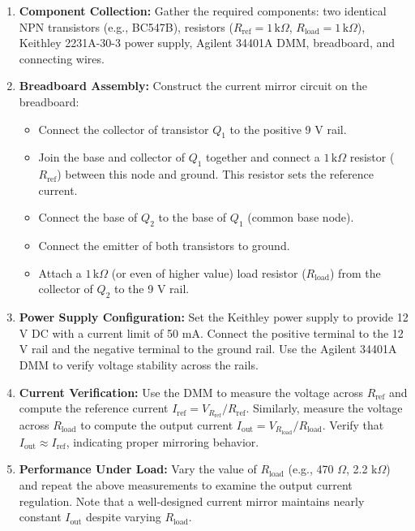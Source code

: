 \documentclass[conference]{IEEEtran}
\begin{document}
\begin{enumerate}
    \item \textbf{Component Collection:} Gather the required components: two identical NPN transistors (e.g., BC547B), resistors ($R_{\text{ref}} = 1 \, \text{k}\Omega$, $R_{\text{load}} = 1 \, \text{k}\Omega$), Keithley 2231A-30-3 power supply, Agilent 34401A DMM, breadboard, and connecting wires.

    \item \textbf{Breadboard Assembly:} Construct the current mirror circuit on the breadboard:
    \begin{itemize}
        \item Connect the collector of transistor $Q_1$ to the positive 9 V rail.
        \item Join the base and collector of $Q_1$ together and connect a $1 \, \text{k}\Omega$ resistor ($R_{\text{ref}}$) between this node and ground. This resistor sets the reference current.
        \item Connect the base of $Q_2$ to the base of $Q_1$ (common base node).
        \item Connect the emitter of both transistors to ground.
        \item Attach a $1 \, \text{k}\Omega$ (or even of higher value) load resistor ($R_{\text{load}}$) from the collector of $Q_2$ to the 9 V rail.
    \end{itemize}

    \item \textbf{Power Supply Configuration:} Set the Keithley power supply to provide 12 V DC with a current limit of 50 mA. Connect the positive terminal to the 12 V rail and the negative terminal to the ground rail. Use the Agilent 34401A DMM to verify voltage stability across the rails.

    \item \textbf{Current Verification:} Use the DMM to measure the voltage across $R_{\text{ref}}$ and compute the reference current $I_{\text{ref}} = V_{R_{\text{ref}}} / R_{\text{ref}}$. Similarly, measure the voltage across $R_{\text{load}}$ to compute the output current $I_{\text{out}} = V_{R_{\text{load}}} / R_{\text{load}}$. Verify that $I_{\text{out}} \approx I_{\text{ref}}$, indicating proper mirroring behavior.

    \item \textbf{Performance Under Load:} Vary the value of $R_{\text{load}}$ (e.g., 470 $\Omega$, 2.2 k$\Omega$) and repeat the above measurements to examine the output current regulation. Note that a well-designed current mirror maintains nearly constant $I_{\text{out}}$ despite varying $R_{\text{load}}$.


\end{enumerate}
\end{document}

